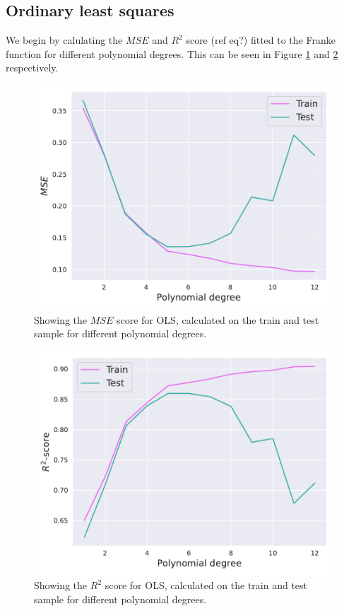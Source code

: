 \documentclass[twocolumn,english,notitlepage]{article}
\begin{document}
    \subsection{Ordinary least squares}
    We begin by calulating the $MSE$ and $R^2$ score (ref eq?) fitted to the Franke function for different polynomial degrees. This can be seen in Figure \ref{fig:res:OLS_mse_noresample} and \ref{fig:res:OLS_R2_noresample} respectively. 
    \begin{figure}[H]
        \centering
        \includegraphics[width=\linewidth]{OLS_mse_noresample.pdf}
        \caption{Showing the $MSE$ score for OLS, calculated on the train and test sample for different polynomial degrees.}
        \label{fig:res:OLS_mse_noresample}
    \end{figure}

    \begin{figure}[H]
        \centering
        \includegraphics[width=\linewidth]{OLS_r2_noresample.pdf}
        \caption{Showing the $R^2$ score for OLS, calculated on the train and test sample for different polynomial degrees.}
        \label{fig:res:OLS_R2_noresample}
    \end{figure}
\end{document}
